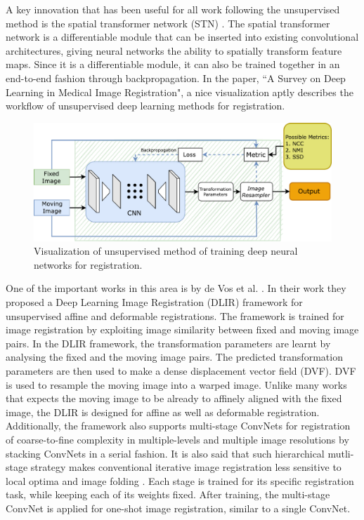 \documentclass{book}
\begin{document}
	A key innovation that has been useful for all work following the unsupervised method is the spatial transformer network (STN) \cite{NIPS2015_33ceb07b}. The spatial transformer network is a differentiable module that can be inserted into existing convolutional architectures, giving neural networks the ability to spatially transform feature maps. Since it is a differentiable module, it can also be trained together in an end-to-end fashion through backpropagation. In the paper, ``A Survey on Deep Learning in Medical Image Registration", \cite{Haskins_2020} a nice visualization aptly describes the workflow of unsupervised deep learning methods for registration.
	
	\begin{figure}[h!]
		\centering
		\includegraphics[width=0.9\columnwidth]{resources/chapter2/unsupervised_visualization.pdf}
		\caption{Visualization of unsupervised method of training deep neural networks for registration. \cite{Haskins_2020}}
		\label{fig:unsupervised_visualization}
	\end{figure}
	
	One of the important works in this area is by de Vos et al. \cite{de_Vos_2019}. In their work they proposed a Deep Learning Image Registration (DLIR) framework for unsupervised affine and deformable registrations. The framework is trained for image registration by exploiting image similarity between fixed and moving image pairs. In the DLIR framework, the transformation parameters are learnt by analysing the fixed and the moving image pairs. The predicted transformation parameters are then used to make a dense displacement vector field (DVF). DVF is used to resample the moving image into a warped image. Unlike many works that expects the moving image to be already to affinely aligned with the fixed image, the DLIR is designed for affine as well as deformable registration. Additionally, the framework also supports multi-stage ConvNets for registration of coarse-to-fine complexity in multiple-levels and multiple image resolutions by stacking ConvNets in a serial fashion. It is also said that such hierarchical mutli-stage strategy makes conventional iterative image registration less sensitive to local optima and image folding \cite{10.1007/3-540-45468-3_69}. Each stage is trained for its specific registration task, while keeping each of its weights fixed. After training, the multi-stage ConvNet is applied for one-shot image registration, similar to a single ConvNet.
	
\end{document}
